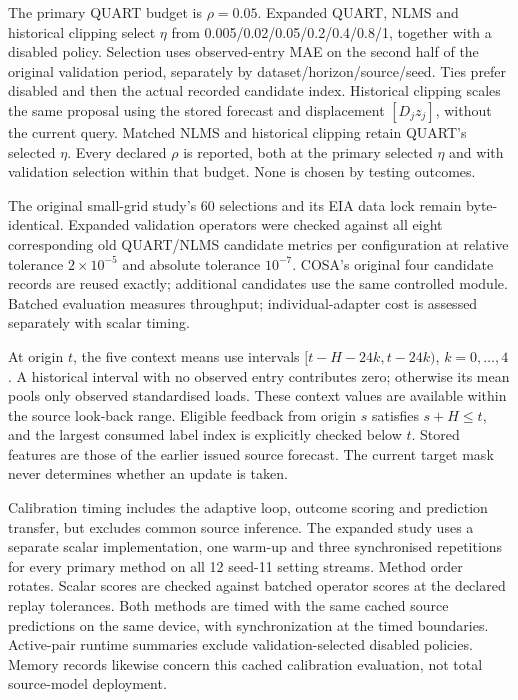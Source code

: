 \documentclass[11pt,a4paper]{article}
\begin{document}
The primary QUART budget is $\rho=0.05$. Expanded QUART, NLMS and historical clipping select $\eta$ from 0.005/0.02/0.05/0.2/0.4/0.8/1, together with a disabled policy. Selection uses observed-entry MAE on the second half of the original validation period, separately by dataset/horizon/source/seed. Ties prefer disabled and then the actual recorded candidate index. Historical clipping scales the same proposal using the stored forecast and displacement $[D_jz_j]$, without the current query. Matched NLMS and historical clipping retain QUART's selected $\eta$. Every declared $\rho$ is reported, both at the primary selected $\eta$ and with validation selection within that budget. None is chosen by testing outcomes.

The original small-grid study's 60 selections and its EIA data lock remain byte-identical. Expanded validation operators were checked against all eight corresponding old QUART/NLMS candidate metrics per configuration at relative tolerance $2\times10^{-5}$ and absolute tolerance $10^{-7}$. COSA's original four candidate records are reused exactly; additional candidates use the same controlled module. Batched evaluation measures throughput; individual-adapter cost is assessed separately with scalar timing.

At origin $t$, the five context means use intervals $[t-H-24k,t-24k)$, $k=0,\ldots,4$. A historical interval with no observed entry contributes zero; otherwise its mean pools only observed standardised loads. These context values are available within the source look-back range. Eligible feedback from origin $s$ satisfies $s+H\leq t$, and the largest consumed label index is explicitly checked below $t$. Stored features are those of the earlier issued source forecast. The current target mask never determines whether an update is taken.

Calibration timing includes the adaptive loop, outcome scoring and prediction transfer, but excludes common source inference. The expanded study uses a separate scalar implementation, one warm-up and three synchronised repetitions for every primary method on all 12 seed-11 setting streams. Method order rotates. Scalar scores are checked against batched operator scores at the declared replay tolerances. Both methods are timed with the same cached source predictions on the same device, with synchronization at the timed boundaries. Active-pair runtime summaries exclude validation-selected disabled policies. Memory records likewise concern this cached calibration evaluation, not total source-model deployment.
\end{document}
